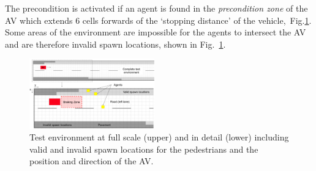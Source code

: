 \documentclass[letterpaper, 10 pt, journal, twoside]{IEEEtran}
\begin{document}
The precondition is activated if an agent is found in the \textit{precondition zone} of the AV which extends 6 cells forwards of the `stopping distance' of the vehicle,~Fig.\ref{gridRoad}. %
%
Some areas of the environment are impossible for the agents to intersect the AV and are therefore invalid spawn locations, shown in Fig.~\ref{gridRoad}. %




\begin{figure}[!t]
	\centering
\includegraphics[width=0.48\textwidth]{RoadLayout.pdf}
	\caption{Test environment at full scale (upper) and in detail (lower) including valid and invalid spawn locations for the pedestrians and the position and direction of the AV.}
	\label{gridRoad}
\end{figure}
\end{document}
